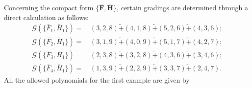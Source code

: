 \documentclass[10pt]{amsart}
\theoremstyle{definition}
\theoremstyle{corollary}
\theoremstyle{remark}
\theoremstyle{conclusion}
\begin{document}
 Concerning the compact form $\{\bar{\textbf{F}},\bar{\textbf{H}}\}$,  certain gradings are determined through a direct calculation as follows: \begin{align}
    \mathcal{G} \left(\{\bar{F}_1, \bar{H}_1\}\right)  = & \, (3,2,8) \tilde{+} (4,1,8)\tilde{+} (5,2,6)\tilde{+} (4,3,6); \nonumber \\
    \mathcal{G} \left(\{\bar{F}_2, \bar{H}_1\}\right)  = & \, (3,1,9) \tilde{+} (4,0,9)\tilde{+} (5,1,7)\tilde{+} (4,2,7);  \nonumber \\
    \mathcal{G} \left(\{\bar{F}_3, \bar{H}_1\}\right)  = & \, (2,3,8) \tilde{+} (3,2,8)\tilde{+} (4,3,6)\tilde{+} (3,4,6); \nonumber \\
    \mathcal{G} \left(\{\bar{F}_4, \bar{H}_1\}\right)  = & \, (1,3,9) \tilde{+} (2,2,9)\tilde{+} (3,3,7)\tilde{+} (2,4,7).
    \end{align} 
   All the allowed polynomials for the first example are given by 
\end{document}
